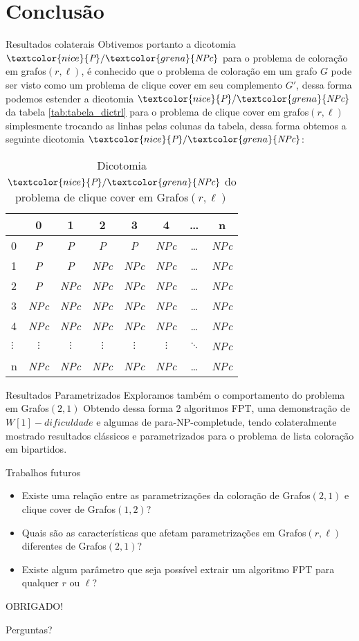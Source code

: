 \documentclass[9pt, compress]{beamer}
\renewcommand{\P}{\textcolor{nice}{\textit{P}}}
\newcommand{\NPc}{\textcolor{grena}{\textit{NPc}}}
\newcommand{\?}{\textcolor{warn}{\textit{?}}}
\begin{document}
     \section{Conclusão}
     \begin{frame}{Resultados colaterais}
       Obtivemos portanto a dicotomia $\P/\NPc$ para o problema de coloração em grafos$(r,\ell)$, é conhecido que o problema de coloração em um grafo $G$ pode ser visto como um problema de clique cover em seu complemento $G'$, dessa forma podemos estender a dicotomia $\P/\NPc$ da tabela \ref{tab:tabela_dictrl} para o problema de clique cover em grafos$(r,\ell)$ simplesmente trocando as linhas pelas colunas da tabela, dessa forma obtemos a seguinte dicotomia $\P/\NPc$:
\begin{table}[!htb]
	\center
	\begin{tabular}{l|*{7}c}
		\toprule
		\backslashbox{$r$}{$l$} & 0 & 1 & 2 & 3 & 4 & \ldots & n\\
		\midrule
		0 & \P & \P & \P & \P & \NPc & \ldots & \NPc\\
		1 & \P & \P & \NPc & \NPc & \NPc & \ldots & \NPc\\
		2 & \P & \NPc & \NPc & \NPc & \NPc & \ldots & \NPc\\
		3 & \NPc & \NPc & \NPc & \NPc & \NPc & \ldots & \NPc\\
		4 & \NPc & \NPc & \NPc & \NPc & \NPc & \ldots & \NPc\\
		$\vdots$ & $\vdots$ & $\vdots$ & $\vdots$ & $\vdots$ & $\vdots$ & $\ddots$ & \NPc\\
		n & \NPc & \NPc & \NPc & \NPc & \NPc & \ldots & \NPc\\
		\bottomrule
	\end{tabular}%
	\caption{Dicotomia $\P/\NPc$ do problema de clique cover em Grafos$(r,\ell)$}%
\end{table}%
     \end{frame}
     \begin{frame}{Resultados Parametrizados}
       Exploramos também o comportamento do problema em Grafos$(2,1)$ Obtendo dessa forma 2 algoritmos FPT, uma demonstração de $W[1]-dificuldade$ e algumas de para-NP-completude, tendo colateralmente mostrado resultados clássicos e parametrizados para o problema de lista coloração em bipartidos.
     \end{frame}
     \begin{frame}{Trabalhos futuros}
       \begin{itemize}
  \item Existe uma relação entre as parametrizações da coloração de Grafos$(2,1)$ e clique cover de Grafos$(1,2)$?
  \item Quais são as características que afetam parametrizações em Grafos$(r,\ell)$ diferentes de Grafos$(2,1)$?
  \item Existe algum parâmetro que seja possível extrair um algoritmo FPT para qualquer $r$ ou $\ell$?
\end{itemize}
     \end{frame}
     \begin{frame}[standout]
       OBRIGADO!
       
       Perguntas?
     \end{frame}
\end{document}

